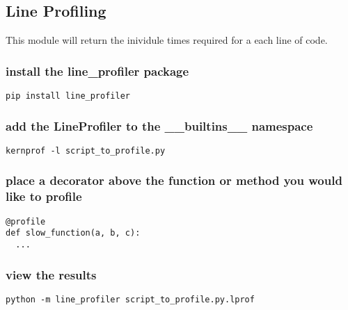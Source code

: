 \subsection{Line Profiling}
This module will return the inividule times required for a each line of code.

\subsubsection{install the line\_profiler package}
\begin{lstlisting}
pip install line_profiler
\end{lstlisting}
\subsubsection{add the LineProfiler to the \_\_builtins\_\_ namespace}
\begin{lstlisting}
kernprof -l script_to_profile.py
\end{lstlisting}
\subsubsection{place a decorator above the function or method you would like to profile}
\begin{lstlisting}
@profile
def slow_function(a, b, c):
  ...
\end{lstlisting}
\subsubsection{view the results}
\begin{lstlisting}
python -m line_profiler script_to_profile.py.lprof
\end{lstlisting}

